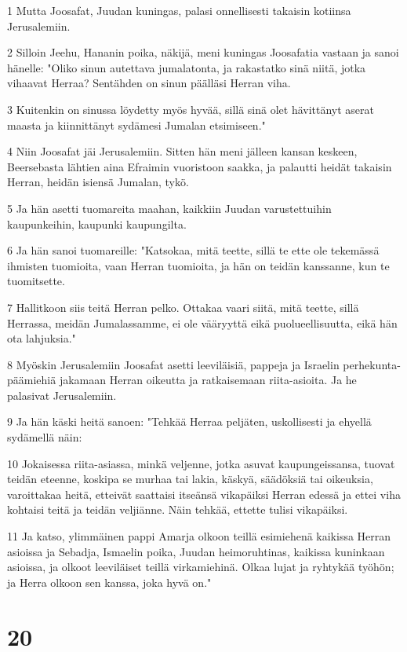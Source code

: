 \par 1 Mutta Joosafat, Juudan kuningas, palasi onnellisesti takaisin kotiinsa Jerusalemiin.
\par 2 Silloin Jeehu, Hananin poika, näkijä, meni kuningas Joosafatia vastaan ja sanoi hänelle: "Oliko sinun autettava jumalatonta, ja rakastatko sinä niitä, jotka vihaavat Herraa? Sentähden on sinun päälläsi Herran viha.
\par 3 Kuitenkin on sinussa löydetty myös hyvää, sillä sinä olet hävittänyt aserat maasta ja kiinnittänyt sydämesi Jumalan etsimiseen."
\par 4 Niin Joosafat jäi Jerusalemiin. Sitten hän meni jälleen kansan keskeen, Beersebasta lähtien aina Efraimin vuoristoon saakka, ja palautti heidät takaisin Herran, heidän isiensä Jumalan, tykö.
\par 5 Ja hän asetti tuomareita maahan, kaikkiin Juudan varustettuihin kaupunkeihin, kaupunki kaupungilta.
\par 6 Ja hän sanoi tuomareille: "Katsokaa, mitä teette, sillä te ette ole tekemässä ihmisten tuomioita, vaan Herran tuomioita, ja hän on teidän kanssanne, kun te tuomitsette.
\par 7 Hallitkoon siis teitä Herran pelko. Ottakaa vaari siitä, mitä teette, sillä Herrassa, meidän Jumalassamme, ei ole vääryyttä eikä puolueellisuutta, eikä hän ota lahjuksia."
\par 8 Myöskin Jerusalemiin Joosafat asetti leeviläisiä, pappeja ja Israelin perhekunta-päämiehiä jakamaan Herran oikeutta ja ratkaisemaan riita-asioita. Ja he palasivat Jerusalemiin.
\par 9 Ja hän käski heitä sanoen: "Tehkää Herraa peljäten, uskollisesti ja ehyellä sydämellä näin:
\par 10 Jokaisessa riita-asiassa, minkä veljenne, jotka asuvat kaupungeissansa, tuovat teidän eteenne, koskipa se murhaa tai lakia, käskyä, säädöksiä tai oikeuksia, varoittakaa heitä, etteivät saattaisi itseänsä vikapäiksi Herran edessä ja ettei viha kohtaisi teitä ja teidän veljiänne. Näin tehkää, ettette tulisi vikapäiksi.
\par 11 Ja katso, ylimmäinen pappi Amarja olkoon teillä esimiehenä kaikissa Herran asioissa ja Sebadja, Ismaelin poika, Juudan heimoruhtinas, kaikissa kuninkaan asioissa, ja olkoot leeviläiset teillä virkamiehinä. Olkaa lujat ja ryhtykää työhön; ja Herra olkoon sen kanssa, joka hyvä on."

\chapter{20}

